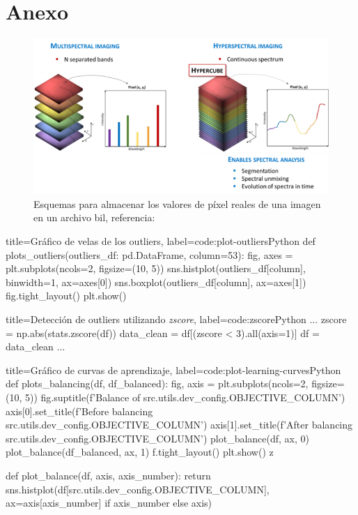 \section{Anexo}
\label{sec:anex}

\begin{figure}[!htb]
    \centering
    \includegraphics[width=0.7\linewidth]{media/images/hyperspectral_image.png}
    \caption{Esquemas para almacenar los valores de píxel reales de una imagen en un archivo \acrshort{bil}, referencia: \cite{Archivos82:online}}
    \label{fig:hyperspectral_image}
\end{figure}

\begin{code}[numbers=left]{title=Gráfico de velas de los outliers, label=code:plot-outliers}{Python}
def plots_outliers(outliers_df: pd.DataFrame, column=53):
    fig, axes = plt.subplots(ncols=2, figsize=(10, 5))
    sns.histplot(outliers_df[column], binwidth=1, ax=axes[0])
    sns.boxplot(outliers_df[column], ax=axes[1])
    fig.tight_layout()
    plt.show()
\end{code}

\begin{code}[numbers=left]{title=Detección de outliers utilizando \textit{zscore}, label=code:zscore}{Python}
...
    zscore = np.abs(stats.zscore(df))
    data_clean = df[(zscore < 3).all(axis=1)]
    df = data_clean
...
\end{code}

\begin{code}[numbers=left]{title=Gráfico de curvas de aprendizaje, label=code:plot-learning-curves}{Python}
def plots_balancing(df, df_balanced):
    fig, axis = plt.subplots(ncols=2, figsize=(10, 5))
    fig.suptitle(f'Balance of {src.utils.dev_config.OBJECTIVE_COLUMN}')
    axis[0].set_title(f'Before balancing {src.utils.dev_config.OBJECTIVE_COLUMN}')
    axis[1].set_title(f'After balancing {src.utils.dev_config.OBJECTIVE_COLUMN}')
    plot_balance(df, ax, 0)
    plot_balance(df_balanced, ax, 1)
    f.tight_layout()
    plt.show()
z

def plot_balance(df, axis, axis_number):
    return sns.histplot(df[src.utils.dev_config.OBJECTIVE_COLUMN], ax=axis[axis_number] if axis_number else axis)
\end{code}

